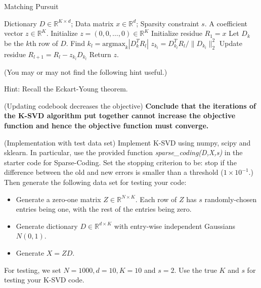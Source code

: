 \begin{Parts}
 \begin{algorithm}[H] 
       \caption{Matching Pursuit}
       \label{alg:practical-mps}
       \begin{algorithmic}
       \Require Dictionary $D\in\mathbb R^{K\times d}$; Data matrix $x\in \mathbb R^d$; Sparsity constraint $s$. 
       \Ensure A coefficient vector $z\in\mathbb R^K$.
          \State Initialize $z=(0,0,\dots,0)\in\mathbb R^K$
          \State Initialize residue $R_1 = x$
            \State Let $D_k$ be the $k$th row of $D$.
            \State Find $k_l=\text{argmax}_k |D_k^TR_l|$
            \State $z_{k_l} = D_{k_l}^TR_l / \|D_{k_l}\|_2^2 $
            \State Update residue $R_{l+1}=R_l - z_{k_l} D_{k_l}$ 
          \EndFor
          \State Return $z$.  
    \EndFunction
       \end{algorithmic}
 \end{algorithm}




 (You may or may not find the following hint useful.)

Hint: Recall the Eckart-Young theorem.





\Part (Updating codebook decreases the objective) {\bf Conclude that
  the iterations of the K-SVD algorithm put together cannot increase
  the objective function and hence the objective function must
  converge.}




\Part (Implementation with test data set) Implement K-SVD using numpy,
scipy and sklearn. In particular, use the provided function
\textit{sparse\_coding(D,X,s)} in the starter code for
Sparse-Coding. Set the stopping criterion to be: stop if the
difference between the old and new errors is smaller than a threshold
($1\times 10^{-1}$.) 
Then generate the following data set for testing your code: 
\begin{itemize}
  \item Generate a zero-one matrix $Z\in\mathbb R^{N\times K}$. Each row of $Z$ has $s$ randomly-chosen entries being one, with the rest of the entries being zero.  
  \item Generate dictionary $D\in\mathbb R^{d\times K}$ with entry-wise independent Gaussians $N(0,1)$. 
  \item Generate $X=ZD$.
\end{itemize}
For testing, we set $N=1000, d=10, K=10$ and $s=2$. Use the true $K$
and $s$ for testing your K-SVD code. 


\end{Parts}

